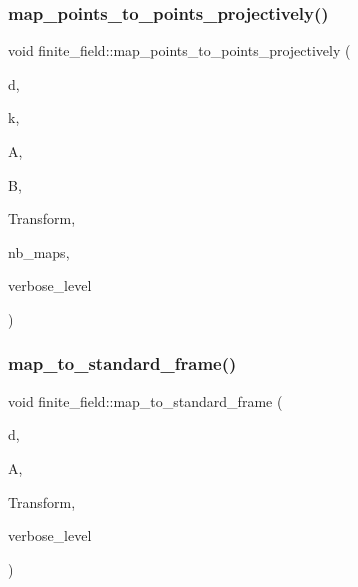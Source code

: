 \subsubsection{\texorpdfstring{map\+\_\+points\+\_\+to\+\_\+points\+\_\+projectively()}{map\_points\_to\_points\_projectively()}}
{\footnotesize\ttfamily void finite\+\_\+field\+::map\+\_\+points\+\_\+to\+\_\+points\+\_\+projectively (\begin{DoxyParamCaption}\item[{\mbox{\hyperlink{galois_8h_a09fddde158a3a20bd2dcadb609de11dc}{I\+NT}}}]{d,  }\item[{\mbox{\hyperlink{galois_8h_a09fddde158a3a20bd2dcadb609de11dc}{I\+NT}}}]{k,  }\item[{\mbox{\hyperlink{galois_8h_a09fddde158a3a20bd2dcadb609de11dc}{I\+NT}} $\ast$}]{A,  }\item[{\mbox{\hyperlink{galois_8h_a09fddde158a3a20bd2dcadb609de11dc}{I\+NT}} $\ast$}]{B,  }\item[{\mbox{\hyperlink{galois_8h_a09fddde158a3a20bd2dcadb609de11dc}{I\+NT}} $\ast$}]{Transform,  }\item[{\mbox{\hyperlink{galois_8h_a09fddde158a3a20bd2dcadb609de11dc}{I\+NT}} \&}]{nb\+\_\+maps,  }\item[{\mbox{\hyperlink{galois_8h_a09fddde158a3a20bd2dcadb609de11dc}{I\+NT}}}]{verbose\+\_\+level }\end{DoxyParamCaption})}

\mbox{\label{classfinite__field_ab35609fc5533b425df702652db00024b}} 
\subsubsection{\texorpdfstring{map\+\_\+to\+\_\+standard\+\_\+frame()}{map\_to\_standard\_frame()}}
{\footnotesize\ttfamily void finite\+\_\+field\+::map\+\_\+to\+\_\+standard\+\_\+frame (\begin{DoxyParamCaption}\item[{\mbox{\hyperlink{galois_8h_a09fddde158a3a20bd2dcadb609de11dc}{I\+NT}}}]{d,  }\item[{\mbox{\hyperlink{galois_8h_a09fddde158a3a20bd2dcadb609de11dc}{I\+NT}} $\ast$}]{A,  }\item[{\mbox{\hyperlink{galois_8h_a09fddde158a3a20bd2dcadb609de11dc}{I\+NT}} $\ast$}]{Transform,  }\item[{\mbox{\hyperlink{galois_8h_a09fddde158a3a20bd2dcadb609de11dc}{I\+NT}}}]{verbose\+\_\+level }\end{DoxyParamCaption})}

